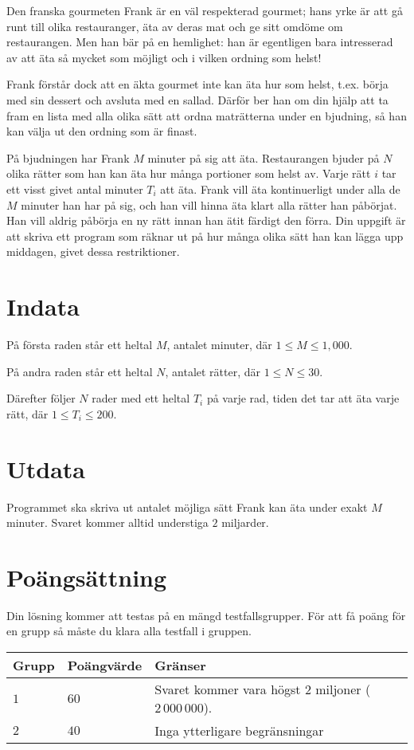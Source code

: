 Den franska gourmeten Frank är en väl respekterad gourmet; hans yrke är att gå runt till olika restauranger, äta av deras mat och ge sitt omdöme om restaurangen.
Men han bär på en hemlighet: han är egentligen bara intresserad av att äta så mycket som möjligt och i vilken ordning som helst!

Frank förstår dock att en äkta gourmet inte kan äta hur som helst, t.ex. börja med sin dessert och avsluta med en sallad.
Därför ber han om din hjälp att ta fram en lista med alla olika sätt att ordna maträtterna under en bjudning, så han kan välja ut den ordning som är finast.

På bjudningen har Frank $M$ minuter på sig att äta.
Restaurangen bjuder på $N$ olika rätter som han kan äta hur många portioner som helst av.
Varje rätt $i$ tar ett visst givet antal minuter $T_i$ att äta.
Frank vill äta kontinuerligt under alla de $M$ minuter han har på sig, och han vill hinna äta klart alla rätter han påbörjat.
Han vill aldrig påbörja en ny rätt innan han ätit färdigt den förra.
Din uppgift är att skriva ett program som räknar ut på hur många olika sätt han kan lägga upp middagen, givet dessa restriktioner.

\section*{Indata}
På första raden står ett heltal $M$, antalet minuter, där $1 \le M \le 1,000$.

På andra raden står ett heltal $N$, antalet rätter, där $1 \le N \le 30$.

Därefter följer $N$ rader med ett heltal $T_i$ på varje rad, tiden det tar att äta varje rätt, där $1 \le T_i \le 200$.

\section*{Utdata}
Programmet ska skriva ut antalet möjliga sätt Frank kan äta under exakt $M$ minuter.
Svaret kommer alltid understiga $2$ miljarder.

\section*{Poängsättning}
Din lösning kommer att testas på en mängd testfallsgrupper.
För att få poäng för en grupp så måste du klara alla testfall i gruppen.

\noindent
\begin{tabular}{| l | l | p{12cm} |}
  \hline
  Grupp & Poängvärde & Gränser \\ \hline
$1$    & $60$        & Svaret kommer vara högst $2$ miljoner ($2\,000\,000$). \\ \hline 
$2$    & $40$        & Inga ytterligare begränsningar \\ \hline
\end{tabular}


